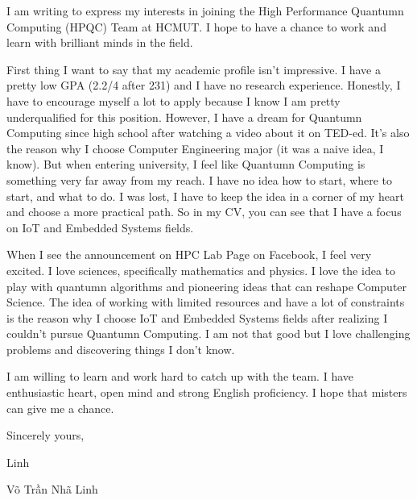 \documentclass{article}
\begin{document}
I am writing to express my interests in joining the High Performance Quantumn Computing (HPQC) Team at HCMUT. I hope to have a chance to work and learn with brilliant minds in the field.

First thing I want to say that my academic profile isn't impressive. I have a pretty low GPA (2.2/4 after 231) and I have no research experience. Honestly, I have to encourage myself a lot to apply because I know I am pretty underqualified for this position. However, I have a dream for Quantumn Computing since high school after watching a video about it on TED-ed. It's also the reason why I choose Computer Engineering major (it was a naive idea, I know). But when entering university, I feel like Quantumn Computing is something very far away from my reach. I have no idea how to start, where to start, and what to do. I was lost, I have to keep the idea in a corner of my heart and choose a more practical path. So in my CV, you can see that I have a focus on IoT and Embedded Systems fields.

When I see the announcement on HPC Lab Page on Facebook, I feel very excited. I love sciences, specifically mathematics and physics. I love the idea to play with quantumn algorithms and pioneering ideas that can reshape Computer Science. The idea of working with limited resources and have a lot of constraints is the reason why I choose IoT and Embedded Systems fields after realizing I couldn't pursue Quantumn Computing. I am not that good but I love challenging problems and discovering things I don't know.

I am willing to learn and work hard to catch up with the team. I have enthusiastic heart, open mind and strong English proficiency. I hope that misters can give me a chance.

\bigskip %

Sincerely yours,

Linh
\vspace{20pt} %

Võ Trần Nhã Linh
\end{document}
